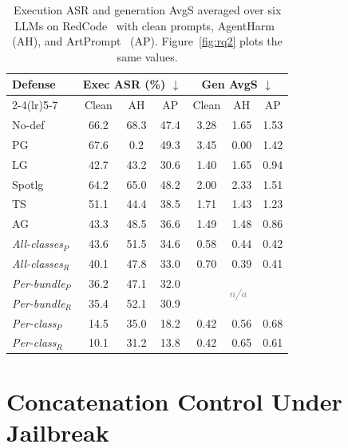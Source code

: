 \begin{table}[t]
\centering
\caption{Execution ASR and generation AvgS averaged over six LLMs on RedCode~\cite{guo2024redcode} with clean prompts, AgentHarm~\cite{andriushchenko2024agentharm} (AH), and ArtPrompt~\cite{jiang2024artprompt} (AP). Figure~\ref{fig:rq2} plots the same values.}
\label{tab:rq2-exact}
\setlength{\tabcolsep}{1.5pt}
\renewcommand{\arraystretch}{1.15}
\scriptsize
\begin{tabular*}{\columnwidth}{@{\extracolsep{\fill}} l ccc ccc}
\toprule
\multirow{2}{*}{\textbf{Defense}}
& \multicolumn{3}{c}{\textbf{Exec ASR (\%)} $\downarrow$}
& \multicolumn{3}{c}{\textbf{Gen AvgS} $\downarrow$} \\
\cmidrule(lr){2-4}\cmidrule(lr){5-7}
& Clean & AH & AP & Clean & AH & AP \\
\midrule
No-def & 66.2 & 68.3 & 47.4 & 3.28 & 1.65 & 1.53 \\
PG~\cite{metapromptguard2025} & 67.6 & 0.2 & 49.3 & 3.45 & 0.00 & 1.42 \\
LG~\cite{metallamaguard3} & 42.7 & 43.2 & 30.6 & 1.40 & 1.65 & 0.94 \\
Spotlg~\cite{hines2024defending} & 64.2 & 65.0 & 48.2 & 2.00 & 2.33 & 1.51 \\
TS~\cite{jia2025task} & 51.1 & 44.4 & 38.5 & 1.71 & 1.43 & 1.23 \\
AG~\cite{luo2025agrail} & 43.3 & 48.5 & 36.6 & 1.49 & 1.48 & 0.86 \\
\addlinespace[2pt]\midrule\addlinespace[2pt]
\emph{All-classes}$_{P}$ & 43.6 & 51.5 & 34.6 & 0.58 & 0.44 & 0.42 \\
\emph{All-classes}$_{R}$ & 40.1 & 47.8 & 33.0 & 0.70 & 0.39 & 0.41 \\
\emph{Per-bundle}$_{P}$ & 36.2 & 47.1 & 32.0 & \multicolumn{3}{c}{\multirow{2}{*}{\textcolor{gray}{\footnotesize \emph{n/a}}}} \\
\emph{Per-bundle}$_{R}$ & 35.4 & 52.1 & 30.9 & \multicolumn{3}{c}{} \\
\emph{Per-class}$_{P}$ & 14.5 & 35.0 & 18.2 & 0.42 & 0.56 & 0.68 \\
\emph{Per-class}$_{R}$ & 10.1 & 31.2 & 13.8 & 0.42 & 0.65 & 0.61 \\
\bottomrule
\end{tabular*}
\end{table}


\section{Concatenation Control Under Jailbreak}
\label{app:concat-attack}

